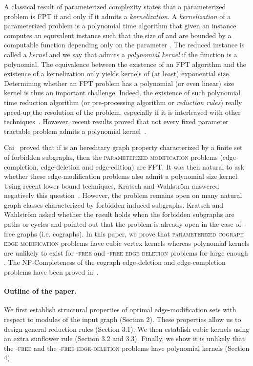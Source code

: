 \documentclass[11pt]{article}
\begin{document}
\medskip
A classical result of parameterized complexity states that a parameterized problem  is FPT if and only if it admits a \emph{kernelization}. 
A \emph{kernelization} of a parameterized problem  is a polynomial time algorithm  that given an instance  computes an equivalent instance  such that the size of  and  are bounded by a computable function  depending only on the parameter . The reduced instance  is called a \emph{kernel} and we say that  admits a \emph{polynomial kernel} if the function  is a polynomial. The equivalence between  the existence of an FPT algorithm and the existence of a kernelization only yields kernels of (at least) exponential size. Determining whether an FPT problem has a polynomial (or even linear) size kernel is thus an important challenge. Indeed, the existence of such polynomial time reduction algorithm (or pre-processing algorithm or \emph{reduction rules}) really speed-up the resolution of the problem, especially if it is interleaved with other techniques~\cite{NR00}. However, recent results proved that not every fixed parameter tractable problem admits a polynomial kernel~\cite{BDFH08}. 

Cai~\cite{Cai96} proved that if  is an hereditary graph property characterized by a finite set of forbidden subgraphs, then the \textsc{parameterized  modification} problems (edge-completion, edge-deletion and edge-edition) are FPT. It was then natural to ask~\cite{Cai96} whether these  edge-modification problems also admit a polynomial size kernel. Using recent lower bound techniques, Kratsch and Wahlstr\"om answered negatively this question~\cite{KW09}. However, the problem remains open on many natural graph classes characterized by forbidden induced subgraphs. Kratsch and Wahlstr\"om asked whether the result holds when the forbidden subgraphs are paths or cycles and pointed out that the problem is already open in the case of -free graphs (i.e. cographs). In this paper, we prove that \textsc{parameterized cograph edge modification} problems have cubic vertex kernels whereas polynomial kernels are unlikely to exist for \textsc{-free} and \textsc{-free edge deletion} problems for large enough .
The NP-Completeness of the cograph edge-deletion and edge-completion problems have been proved in~\cite{EC88}.

\paragraph{Outline of the paper.}
We first establish structural properties of optimal edge-modification sets with respect to modules of the input graph (Section 2). These properties allow us to design general reduction rules (Section 3.1). We then establish cubic kernels using an extra sunflower rule (Section 3.2 and 3.3). Finally, we show it is unlikely that the \textsc{-free} and the \textsc{-free edge-deletion} problems have polynomial kernels (Section 4).
\end{document}
